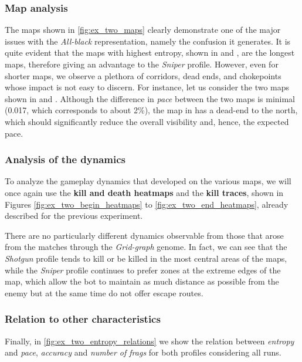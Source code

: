 \subsubsection{Map analysis}
The maps shown in \ref{fig:ex_two_maps} clearly demonstrate one of the major issues with the \textit{All-black} representation, namely the confusion it generates. It is quite evident that the maps with highest entropy, shown in  and , are the longest maps, therefore giving an advantage to the \textit{Sniper} profile. However, even for shorter maps, we observe a plethora of corridors, dead ends, and chokepoints whose impact is not easy to discern. For instance, let us consider the two maps shown in  and . Although the difference in \textit{pace} between the two maps is minimal (0.017, which corresponds to about 2\%), the map in  has a dead-end to the north, which should significantly reduce the overall visibility and, hence, the expected pace.

\subsubsection{Analysis of the dynamics}
To analyze the gameplay dynamics that developed on the various maps, we will once again use the \textbf{kill and death heatmaps} and the \textbf{kill traces}, shown in Figures \ref{fig:ex_two_begin_heatmaps} to \ref{fig:ex_two_end_heatmaps}, already described for the previous experiment.

There are no particularly different dynamics observable from those that arose from the matches through the \textit{Grid-graph} genome. In fact, we can see that the \textit{Shotgun} profile tends to kill or be killed in the most central areas of the maps, while the \textit{Sniper} profile continues to prefer zones at the extreme edges of the map, which allow the bot to maintain as much distance as possible from the enemy but at the same time do not offer escape routes.

\subsubsection{Relation to other characteristics}
Finally, in \ref{fig:ex_two_entropy_relations} we show the relation between \textit{entropy} and \textit{pace}, \textit{accuracy} and \textit{number of frags} for both profiles considering all runs.

